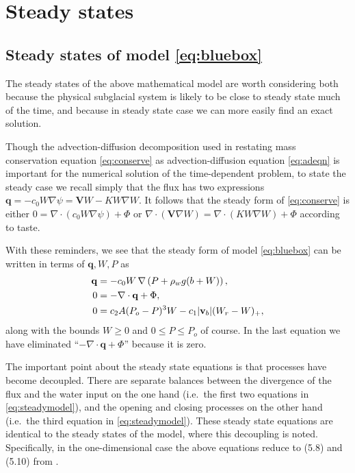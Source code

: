 \documentclass[11pt,final]{amsart}%
\newcommand\bv{\mathbf{v}}
\newcommand\bV{\mathbf{V}}
\newcommand\bq{\mathbf{q}}
\newcommand{\Div}{\nabla\cdot}
\newcommand{\grad}{\nabla}
\begin{document}
\section{Steady states}  \label{sec:steadyverif}

\subsection*{Steady states of model \eqref{eq:bluebox}}  The steady states of the above mathematical model are worth considering both because the physical subglacial system is likely to be close to steady state much of the time, and because in steady state case we can more easily find an exact solution.

Though the advection-diffusion decomposition used in restating mass conservation equation \eqref{eq:conserve} as advection-diffusion equation \eqref{eq:adeqn} is important for the numerical solution of the time-dependent problem, to state the steady case we recall simply that the flux has two expressions $\bq = - c_0 W \grad \psi = \bV W - K W \grad W$.  It follows that the steady form of \eqref{eq:conserve} is either $0 = \Div\left(c_0 W \grad \psi\right) + \Phi$ or $\Div \left(\bV \grad W\right) = \Div\left(K W \grad W\right) + \Phi$ according to taste.

With these reminders, we see that the steady form of model \eqref{eq:bluebox} can be written in terms of $\bq,W,P$ as
\begin{align}
\bq &= - c_0 W\, \grad\left(P + \rho_w g (b+W)\right), \notag \\
0 &= - \Div \bq + \Phi, \label{eq:steadymodel} \\
0 &= c_2 A (P_o - P)^3 W - c_1 |\bv_b| (W_r - W)_+, \notag
\end{align}
along with the bounds $W\ge 0$ and $0 \le P \le P_o$ of course.  In the last equation we have eliminated ``$- \Div \bq + \Phi$'' because it is zero.

The important point about the steady state equations is that processes have become decoupled.  There are separate balances between the divergence of the flux and the water input on the one hand (i.e.~the first two equations in \eqref{eq:steadymodel}), and the opening and closing processes on the other hand (i.e.~the third equation in \eqref{eq:steadymodel}).   These steady state equations are identical to the steady states of the \cite{Schoofetal2012} model, where this decoupling is noted.  Specifically, in the one-dimensional case the above equations reduce to (5.8) and (5.10) from \cite{Schoofetal2012}.
\end{document}
